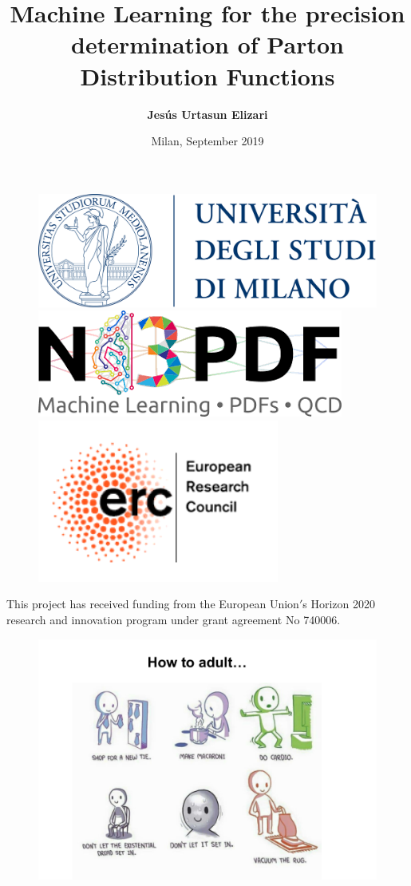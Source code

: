 \documentclass[aspectratio=43]{beamer}
\title[ML for PDFs determination]{Machine Learning for the precision determination of Parton Distribution Functions}
\author{\textbf {Jes\'us Urtasun Elizari}}
\date{Milan, September 2019}
\begin{document}
\begin{frame}



	\begin{figure}
		\includegraphics[width = 3.0 cm]{unimi.png}
		\hfill
		\includegraphics[width = 3.0 cm]{n3pdf.png}
		\hfill
		\includegraphics[width = 3.0 cm]{erc.png}
		\endminipage
	\end{figure}

	\vspace{1.0 cm}
	{ \tiny This project has received funding from the European Union$'$s Horizon 2020 research and innovation program under grant agreement No 740006.}

\end{frame}

\begin{frame}

	\begin{figure}
		\includegraphics[width = \linewidth]{joke1.png}
	\end{figure}

\end{frame}
\end{document}
